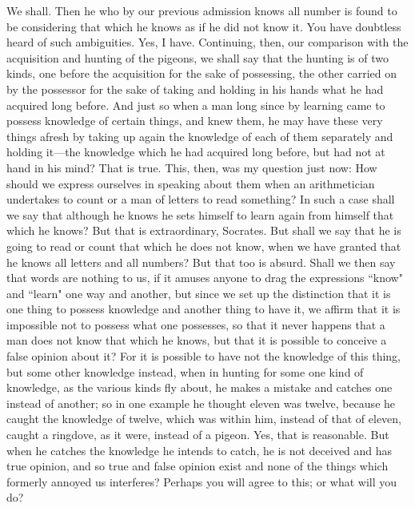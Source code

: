 \documentclass[letterpaper,12pt]{article}
\newcommand{\stephpag}[1]{\marginnote{\small\itshape\fontfamily{ppl}\selectfont #1}}
\begin{document}
\begin{drama}
\theaetetusspeaks
We shall.
\socratesspeaks
Then he who by our previous admission knows all number is found to be considering that which he knows as if he did not know it. You have doubtless heard of such ambiguities.
\theaetetusspeaks
Yes, I have.
\socratesspeaks
Continuing, then, our comparison with the acquisition \stephpag{d} and hunting of the pigeons, we shall say that the hunting is of two kinds, one before the acquisition for the sake of possessing, the other carried on by the possessor for the sake of taking and holding in his hands what he had acquired long before. And just so when a man long since by learning came to possess knowledge of certain things, and knew them, he may have these very things afresh by taking up again the knowledge of each of them separately and holding it—the knowledge which he had acquired long before, but had not at hand in his mind?
\theaetetusspeaks
That is true. \stephpag{e}
\socratesspeaks
This, then, was my question just now: How should we express ourselves in speaking about them when an arithmetician undertakes to count or a man of letters to read something? In such a case shall we say that although he knows he sets himself to learn again from himself that which he knows?
\theaetetusspeaks
But that is extraordinary, Socrates.
\socratesspeaks
But shall we say that he is going to read or count that which he does not know, when we have granted that he knows all letters and all numbers? \stephpag{199 a}
\theaetetusspeaks
But that too is absurd.
\socratesspeaks
Shall we then say that words are nothing to us, if it amuses anyone to drag the expressions ``know" and ``learn" one way and another, but since we set up the distinction that it is one thing to possess knowledge and another thing to have it, we affirm that it is impossible not to possess what one possesses, so that it never happens that a man does not know that which he knows, but that it is possible to conceive a false opinion about it? \stephpag{b} For it is possible to have not the knowledge of this thing, but some other knowledge instead, when in hunting for some one kind of knowledge, as the various kinds fly about, he makes a mistake and catches one instead of another; so in one example he thought eleven was twelve, because he caught the knowledge of twelve, which was within him, instead of that of eleven, caught a ringdove, as it were, instead of a pigeon.
\theaetetusspeaks
Yes, that is reasonable.
\socratesspeaks
But when he catches the knowledge he intends to catch, he is not deceived and has true opinion, and so true and false opinion exist and none of the things \stephpag{c} which formerly annoyed us interferes? Perhaps you will agree to this; or what will you do?

\end{drama}
\end{document}
